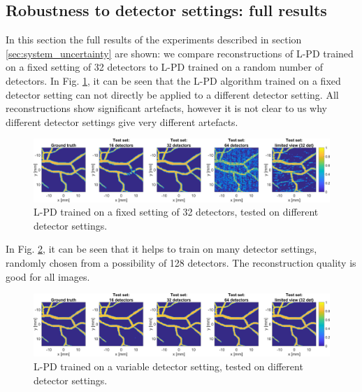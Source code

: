 \documentclass[journal]{IEEEtran}
\newcommand{\hl}[1]{\cbcolor{red}\begin{changebar}{\color{red} #1}\end{changebar}}
\begin{document}
\hl{
\section{Robustness to detector settings: full results}\label{app:det}
In this section the full results of the experiments described in section \ref{sec:system_uncertainty} are shown: we compare reconstructions of L-PD trained on a fixed setting of 32 detectors to L-PD trained on a random number of detectors. In Fig. \ref{fig:detector_settings_0}, it can be seen that the L-PD algorithm trained on a fixed detector setting can not directly be applied to a different detector setting. All reconstructions show significant artefacts, however it is not clear to us why different detector settings give very different artefacts. 

\begin{figure}[ht!]
\centering
\includegraphics[width=\linewidth]{images//detector_changes_0.png}
\caption{L-PD trained on a fixed setting of 32 detectors, tested on different detector settings.}
\label{fig:detector_settings_0}
\end{figure}

In Fig. \ref{fig:detector_settings_1}, it can be seen that it helps to train on many detector settings, randomly chosen from a possibility of 128 detectors. The reconstruction quality is good for all images.

\begin{figure}[ht!]
\centering
\includegraphics[width=\linewidth]{images//detector_changes_1.png}
\caption{L-PD trained on a variable detector setting, tested on different detector settings.}
\label{fig:detector_settings_1}
\end{figure}

}
\end{document}
